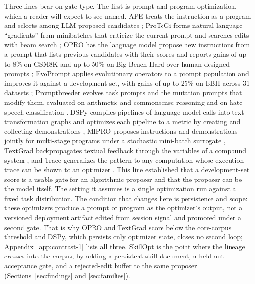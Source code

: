 \documentclass[
  11pt,
]{article}
\begin{document}
Three lines bear on gate type. The first is prompt and program optimization, which a reader will expect to see named. APE treats the instruction as a program and selects among LLM-proposed candidates \cite{zhou2022ape}; ProTeGi forms natural-language ``gradients'' from minibatches that criticize the current prompt and searches edits with beam search \cite{pryzant2023protegi}; OPRO has the language model propose new instructions from a prompt that lists previous candidates with their scores and reports gains of up to 8\% on GSM8K and up to 50\% on Big-Bench Hard over human-designed prompts \cite{yang2023opro}; EvoPrompt applies evolutionary operators to a prompt population and improves it against a development set, with gains of up to 25\% on BBH across 31 datasets \cite{guo2023evoprompt}; Promptbreeder evolves task prompts and the mutation prompts that modify them, evaluated on arithmetic and commonsense reasoning and on hate-speech classification \cite{fernando2023promptbreeder}. DSPy compiles pipelines of language-model calls into text-transformation graphs and optimizes each pipeline to a metric by creating and collecting demonstrations \cite{khattab2023dspy}, MIPRO proposes instructions and demonstrations jointly for multi-stage programs under a stochastic mini-batch surrogate \cite{opsahlong2024miprov2}, TextGrad backpropagates textual feedback through the variables of a compound system \cite{yuksekgonul2024textgrad}, and Trace generalizes the pattern to any computation whose execution trace can be shown to an optimizer \cite{cheng2024trace}. This line established that a development-set score is a usable gate for an algorithmic proposer and that the proposer can be the model itself. The setting it assumes is a single optimization run against a fixed task distribution. The condition that changes here is persistence and scope: these optimizers produce a prompt or program as the optimizer's output, not a versioned deployment artifact edited from session signal and promoted under a second gate. That is why OPRO and TextGrad score below the core-corpus threshold and DSPy, which persists only optimizer state, closes no second loop; Appendix~\ref{app:contrast-1} lists all three. SkillOpt is the point where the lineage crosses into the corpus, by adding a persistent skill document, a held-out acceptance gate, and a rejected-edit buffer to the same proposer (Sections~\ref{sec:findings} and \ref{sec:families}).
\end{document}
